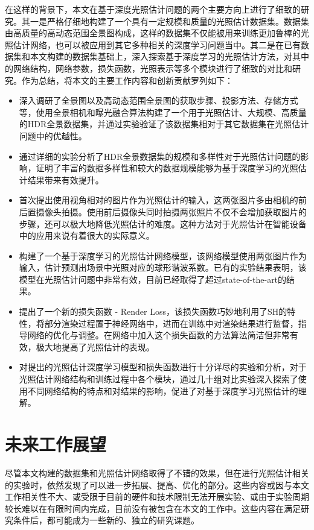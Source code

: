 在这样的背景下，本文在基于深度光照估计问题的两个主要方向上进行了细致的研究。其一是严格仔细地构建了一个具有一定规模和质量的光照估计数据集。数据集由高质量的高动态范围全景图构成，这样的数据集不仅能被用来训练更加鲁棒的光照估计网络，也可以被应用到其它多种相关的深度学习问题当中。其二是在已有数据集和本文构建的数据集基础上，深入探索基于深度学习的光照估计方法，对其中的网络结构，网络参数，损失函数，光照表示等多个模块进行了细致的对比和研究。作为总结，将本文的主要工作内容和创新贡献罗列如下：
\begin{itemize}
    \item 深入调研了全景图以及高动态范围全景图的获取步骤、投影方法、存储方式等，使用全景相机和曝光融合算法构建了一个用于光照估计、大规模、高质量的HDR全景数据集，并通过实验验证了该数据集相对于其它数据集在光照估计问题中的优越性。
    \item 通过详细的实验分析了HDR全景数据集的规模和多样性对于光照估计问题的影响，证明了丰富的数据多样性和较大的数据规模能够为基于深度学习的光照估计结果带来有效提升。
    \item 首次提出使用视角相对的图片作为光照估计的输入，这两张图片多由相机的前后置摄像头拍摄。使用前后摄像头同时拍摄两张照片不仅不会增加获取图片的步骤，还可以极大地降低光照估计的难度。这种方法对于光照估计在智能设备中的应用来说有着很大的实际意义。
    \item 构建了一个基于深度学习的光照估计网络模型，该网络模型使用两张图片作为输入，估计预测出场景中光照对应的球形谐波系数。已有的实验结果表明，该模型在光照估计问题中非常有效，目前已经取得了超过state-of-the-art的结果。
    \item 提出了一个新的损失函数 - Render Loss，该损失函数巧妙地利用了SH的特性，将部分渲染过程置于神经网络中，进而在训练中对渲染结果进行监督，指导网络的优化与调整。在网络中加入这个损失函数的方法算法简洁但非常有效，极大地提高了光照估计的表现。
    \item 对提出的光照估计深度学习模型和损失函数进行十分详尽的实验和分析，对于光照估计网络结构和训练过程中各个模块，通过几十组对比实验深入探索了使用不同网络结构的特点和对结果的影响，促进了对基于深度学习光照估计的理解。
\end{itemize}

\section{未来工作展望}
尽管本文构建的数据集和光照估计网络取得了不错的效果，但在进行光照估计相关的实验时，依然发现了可以进一步拓展、提高、优化的部分。这些内容或因与本文工作相关性不大、或受限于目前的硬件和技术限制无法开展实验、或由于实验周期较长难以在有限时间内完成，目前没有被包含在本文的工作中。这些内容在满足研究条件后，都可能成为一些新的、独立的研究课题。

